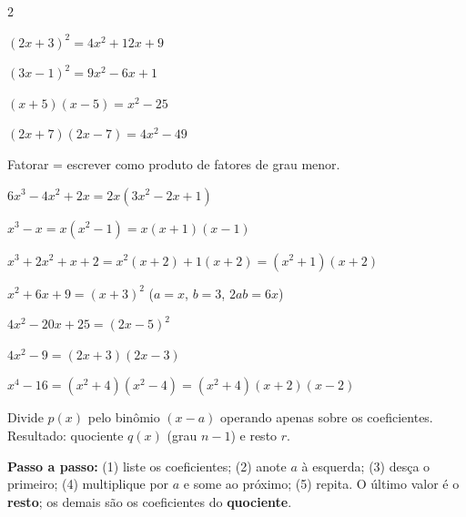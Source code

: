\documentclass[12pt]{article}
\begin{document}
\begin{multicols}{2}
\vspace{-8pt}
\vspace{-8pt}


$(2x+3)^2 = 4x^2 + 12x + 9$

$(3x-1)^2 = 9x^2 - 6x + 1$

$(x+5)(x-5) = x^2 - 25$

$(2x+7)(2x-7) = 4x^2 - 49$



Fatorar = escrever como produto de fatores de grau menor.


$6x^3 - 4x^2 + 2x = \boxed{2x(3x^2 - 2x + 1)}$

$x^3 - x = x(x^2-1) = \boxed{x(x+1)(x-1)}$


$x^3 + 2x^2 + x + 2 = x^2(x+2) + 1(x+2) = \boxed{(x^2+1)(x+2)}$


$x^2+6x+9 = \boxed{(x+3)^2}$ \quad ($a=x$, $b=3$, $2ab=6x$\;\checkmark)

$4x^2-20x+25 = \boxed{(2x-5)^2}$


$4x^2 - 9 = \boxed{(2x+3)(2x-3)}$

$x^4 - 16 = (x^2+4)(x^2-4) = \boxed{(x^2+4)(x+2)(x-2)}$


Divide $p(x)$ pelo binômio $(x - a)$ operando apenas sobre os coeficientes.
Resultado: quociente $q(x)$ (grau $n-1$) e resto $r$.

\textbf{Passo a passo:} (1) liste os coeficientes; (2) anote $a$ à esquerda;
(3) desça o primeiro; (4) multiplique por $a$ e some ao próximo; (5) repita.
O último valor é o \textbf{resto}; os demais são os coeficientes do \textbf{quociente}.


\end{multicols}
\end{document}
